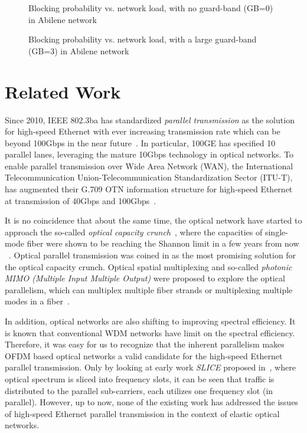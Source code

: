 \documentclass[conference]{IEEEtran}
\begin{document}
     \begin{figure}
 \caption{Blocking probability vs. network load, with no guard-band (GB=0) in Abilene network}\vspace{-0.3cm}
\label{fig:blockGb0}
\end{figure}
    
    \begin{figure}
 \caption{Blocking probability vs. network load, with a large guard-band (GB=3) in Abilene network}\vspace{-0.3cm}
\label{fig:blockGb3}
\end{figure}


 \section{Related Work}\label{relatedwork} 
\par Since 2010, IEEE 802.3ba has standardized  \emph{parallel transmission} as the solution  for high-speed Ethernet with  ever increasing transmission rate which can be beyond 100Gbps in the near future~\cite{802.3ba}.  In particular, 100GE has specified 10 parallel lanes, leveraging the mature 10Gbps technology in optical networks. To enable parallel transmission over Wide Area Network (WAN), the International Telecommunication Union-Telecommunication Standardization Sector (ITU-T), has augmented their G.709 OTN information structure for high-speed Ethernet at transmission of 40Gbps and 100Gbps~\cite{ITU-T:G.709}. 

\par It is no coincidence that about the same time, the optical network have started to approach the so-called 
\emph{optical capacity crunch}~\cite{Chralyvy:ecoc:2009}, where the capacities of single-mode fiber were shown to 
be reaching the Shannon limit  in a few years from now ~\cite{Winzer:2010}\cite{Winzer:2012}. 
Optical parallel transmission was coined in \cite{Winzer:2010} as the most promising  solution for the optical capacity crunch.  Optical spatial multiplexing and so-called  \emph{photonic MIMO (Multiple Input Multiple Output)} were proposed to explore the optical parallelism, 
  which can multiplex multiple fiber strands or multiplexing multiple modes in a fiber~\cite{Winzer:2012}.   


\par In addition, optical networks are also shifting to  improving spectral efficiency.        It is known that conventional WDM networks have limit on the spectral efficiency. Therefore, it was easy for us to recognize that the inherent parallelism makes OFDM based optical networks   a valid candidate for the high-speed Ethernet parallel transmission.  Only by looking at early work \emph{SLICE} proposed in~\cite{Jinno:2009}, where optical spectrum is sliced into frequency slots, it can be seen that traffic is distributed to the parallel sub-carriers, each utilizes one frequency slot (in parallel). However, up to now, none of the existing work has addressed the issues of high-speed Ethernet parallel transmission in the context of elastic optical networks.  
\end{document}
